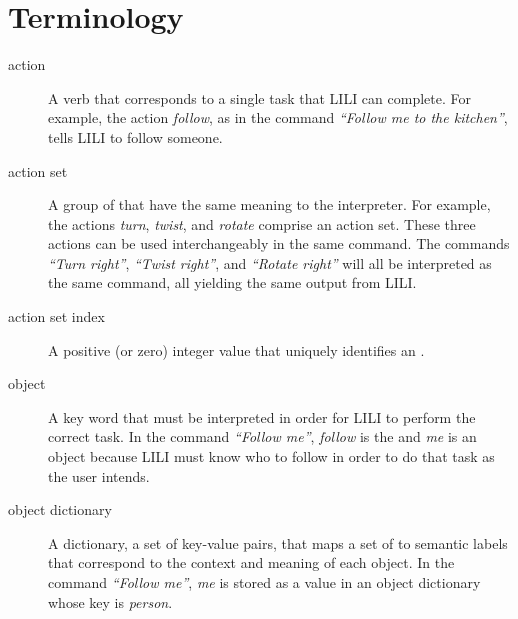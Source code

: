 \documentclass[letterpaper,10pt,english]{sphinxmanual}
\begin{document}
\chapter{Terminology}
\label{terms::doc}\label{terms:terminology}\label{terms:action}\begin{description}
\item[{action}] \leavevmode
A verb that corresponds to a single task that LILI can complete. For example, the action \emph{follow}, as in the command \emph{``Follow me to the kitchen''}, tells LILI to follow someone.

\end{description}
\label{terms:action-set}\begin{description}
\item[{action set}] \leavevmode
A group of {\hyperref[terms:action]{\emph{}}} that have the same meaning to the interpreter. For example, the actions \emph{turn}, \emph{twist}, and \emph{rotate} comprise an action set. These three actions can be used interchangeably in the same command. The commands \emph{``Turn right''}, \emph{``Twist right''}, and \emph{``Rotate right''} will all be interpreted as the same command, all yielding the same output from LILI.

\end{description}
\label{terms:action-set-index}\begin{description}
\item[{action set index}] \leavevmode
A positive (or zero) integer value that uniquely identifies an {\hyperref[terms:action-set]{\emph{}}}.

\end{description}
\label{terms:object}\begin{description}
\item[{object}] \leavevmode
A key word that must be interpreted in order for LILI to perform the correct task. In the command \emph{``Follow me''}, \emph{follow} is the {\hyperref[terms:action]{\emph{}}} and \emph{me} is an object because LILI must know who to follow in order to do that task as the user intends.

\end{description}
\label{terms:object-dictionary}\begin{description}
\item[{object dictionary}] \leavevmode
A dictionary, a set of key-value pairs, that maps a set of {\hyperref[terms:object]{\emph{}}} to semantic labels that correspond to the context and meaning of each object. In the command \emph{``Follow me''}, \emph{me} is stored as a value in an object dictionary whose key is \emph{person}.

\end{description}
\end{document}
